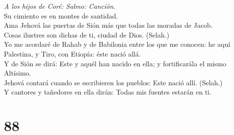  \emph{A los hijos de Coré: Salmo: Canción.}\\
Su cimiento es en montes de santidad.\\
 Ama Jehová las puertas de Sión más que todas las moradas de
Jacob.\\
 Cosas ilustres son dichas de ti, ciudad de Dios. (Selah.)\\
 Yo me acordaré de Rahab y de Babilonia entre los que me
conocen: he aquí Palestina, y Tiro, con Etiopía: éste nació allá.\\
 Y de Sión se dirá: Este y aquél han nacido en ella; y
fortificarála el mismo Altísimo.\\
 Jehová contará cuando se escribieren los pueblos: Este
nació allí. (Selah.)\\
 Y cantores y tañedores en ella dirán: Todas mis fuentes
estarán en ti.

\hypertarget{section-87}{%
\section{88}\label{section-87}}

